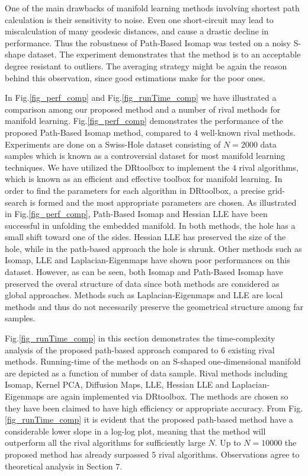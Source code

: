 \documentclass[10pt,journal,cspaper,compsoc]{IEEEtran}
\begin{document}
One of the main drawbacks of manifold learning methods involving shortest path calculation is their sensitivity to noise. Even one short-circuit may lead to miscalculation of many geodesic distances, and cause a drastic decline in performance. Thus the robustness of Path-Based Isomap was tested on a noisy S-shape dataset. The experiment demonstrates that the method is to an acceptable degree resistant to outliers. The averaging strategy might be again the reason behind this observation, since good estimations make for the poor ones.

In Fig.\ref{fig_perf_comp} and Fig.\ref{fig_runTime_comp} we have illustrated a comparison among our proposed method and a number of rival methods for manifold learning. Fig.\ref{fig_perf_comp} demonstrates the performance of the proposed Path-Based Isomap method, compared to $4$ well-known rival methods. Experiments are done on a Swiss-Hole dataset consisting of $N=2000$ data samples which is known as a controversial dataset for most manifold learning techniques. We have utilized the DRtoolbox to implement the $4$ rival algorithms, which is known as an efficient and effective toolbox for manifold learning. In order to find the parameters for each algorithm in DRtoolbox, a precise grid-search is formed and the most appropriate parameters are chosen. As illustrated in Fig.\ref{fig_perf_comp}, Path-Based Isomap and Hessian LLE have been successful in unfolding the embedded manifold. In both methods, the hole has a small shift toward one of the sides. Hessian LLE has preserved the size of the hole, while in the path-based approach the hole is shrunk. Other methods such as Isomap, LLE and Laplacian-Eigenmaps have shown poor performances on this dataset. However, as can be seen, both Isomap and Path-Based Isomap have preserved the overal structure of data since both methods are considered as global approaches. Methods such as Laplacian-Eigenmaps and LLE are local methods and thus do not necessarily preserve the geometrical structure among far samples.

Fig.\ref{fig_runTime_comp} in this section demonstrates the time-complexity analysis of the proposed path-based approach compared to $6$ existing rival methods. Running-time of the methods on an S-shaped one-dimensional manifold are depicted as a function of number of data sample. Rival methods including Isomap, Kernel PCA, Diffusion Maps, LLE, Hessian LLE and Laplacian-Eigenmaps are again implemented via DRtoolbox. The methods are chosen so they have been claimed to have high efficiency or appropriate accuracy. From Fig.\ref{fig_runTime_comp} it is evident that the proposed path-based method have a considerable lower slope in a log-log plot, meaning that the method will outperform all the rival algorithms for sufficiently large $N$. Up to $N=10000$ the proposed method has already surpassed $5$ rival algorithms. Observations agree to theoretical analysis in Section $7$.
\end{document}
